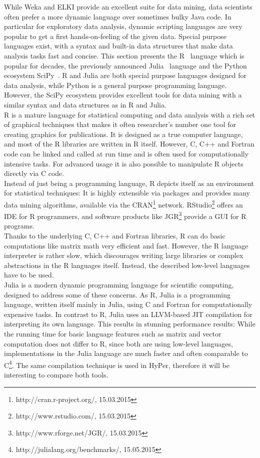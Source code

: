 While Weka and ELKI provide an excellent suite for data mining, data scientists often prefer a more dynamic language over sometimes bulky Java code. In particular for exploratory data analysis, dynamic scripting languages are very popular to get a first hands-on-feeling of the given data. Special purpose languages exist, with a syntax and built-in data structures that make data analysis tasks fast and concise. This section presents the R~\parencite{R/stats} language which is popular for decades, the previously announced Julia~\parencite{DBLP:journals/corr/abs-1209-5145} language and the Python ecosystem SciPy~\parencite{scipy}. R and Julia are both special purpose languages designed for data analysis, while Python is a general purpose programming language. However, the SciPy ecosystem provides excellent tools for data mining with a similar syntax and data structures as in R and Julia.
\\
R is a mature language for statistical computing and data analysis with a rich set of graphical techniques that makes it often researcher's number one tool for creating graphics for publications. It is designed as a true computer language, and most of the R libraries are written in R itself. However, C, C++ and Fortran code can be linked and called at run time and is often used for computationally intensive tasks. For advanced usage it is also possible to manipulate R objects directly via C code.
\\
Instead of just being a programming language, R depicts itself as an environment for statistical techniques: It is highly extensible via packages and provides many data mining algorithms, available via the CRAN\footnote{http://cran.r-project.org/, 15.03.2015} network. RStudio\footnote{http://www.rstudio.com/, 15.03.2015} offers an IDE for R programmers, and software products like JGR\footnote{http://www.rforge.net/JGR/, 15.03.2015} provide a GUI for R programs.
\\
Thanks to the underlying C, C++ and Fortran libraries, R can do basic computations like matrix math very efficient and fast. However, the R language interpreter is rather slow, which discourages writing large libraries or complex abstractions in the R languages itself. Instead, the described low-level languages have to be used.
\\
Julia is a modern dynamic programming language for scientific computing, designed to address some of these concerns. As R, Julia is a programming language, written itself mainly in Julia, using C and Fortran for computationally expensive tasks. In contrast to R, Julia uses an LLVM-based JIT compilation for interpreting its own language. This results in stunning performance results: While the running time for basic language features such as matrix and vector computation does not differ to R, since both are using low-level languages, implementations in the Julia language are much faster and often comparable to C\footnote{http://julialang.org/benchmarks/, 15.05.2015}. The same compilation technique is used in HyPer, therefore it will be interesting to compare both tools.
